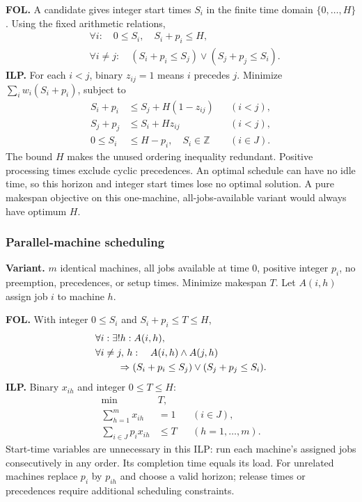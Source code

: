 \textbf{FOL.} A candidate gives integer start times $S_i$ in the finite
time domain $\{0,\ldots,H\}$. Using the fixed arithmetic relations,
\[
\begin{aligned}
 &\forall i:\quad 0\le S_i,\quad S_i+p_i\le H,\\
 &\forall i\ne j:\quad
 (S_i+p_i\le S_j)\lor(S_j+p_j\le S_i).
\end{aligned}
\]
\textbf{ILP.} For each $i<j$, binary $z_{ij}=1$ means $i$ precedes $j$.
Minimize $\sum_iw_i(S_i+p_i)$, subject to
\[
\begin{aligned}
 S_i+p_i&\le S_j+H(1-z_{ij}) &&(i<j),\\
 S_j+p_j&\le S_i+Hz_{ij} &&(i<j),\\
 0\le S_i&\le H-p_i,\quad S_i\in\mathbb Z &&(i\in J).
\end{aligned}
\]
The bound $H$ makes the unused ordering inequality redundant. Positive
processing times exclude cyclic precedences. An optimal schedule can have
no idle time, so this horizon and integer start times lose no optimal
solution. A pure makespan objective on this one-machine, all-jobs-available
variant would always have optimum $H$.

\subsubsection{Parallel-machine scheduling}\label{form:parallel}
\textbf{Variant.} $m$ identical machines, all jobs available at time 0,
positive integer $p_i$, no preemption, precedences, or setup times.
Minimize makespan $T$. Let $A(i,h)$ assign job $i$ to machine $h$.

\textbf{FOL.} With integer $0\le S_i$ and $S_i+p_i\le T\le H$,
\[
\begin{aligned}
 &\forall i:\exists!h:A(i,h),\\
 &\forall i\ne j,\,h:\quad A(i,h)\land A(j,h)\\
 &\hspace{8mm}\Rightarrow
 (S_i+p_i\le S_j)\lor(S_j+p_j\le S_i).
\end{aligned}
\]
\textbf{ILP.} Binary $x_{ih}$ and integer $0\le T\le H$:
\[
\begin{aligned}
 \min\quad &T,\\
 \sum_{h=1}^m x_{ih}&=1 &&(i\in J),\\
 \sum_{i\in J}p_ix_{ih}&\le T &&(h=1,\ldots,m).
\end{aligned}
\]
Start-time variables are unnecessary in this ILP: run each machine's assigned
jobs consecutively in any order. Its completion time equals its load.
For unrelated machines replace $p_i$ by $p_{ih}$ and choose a valid horizon;
release times or precedences require additional scheduling constraints.

